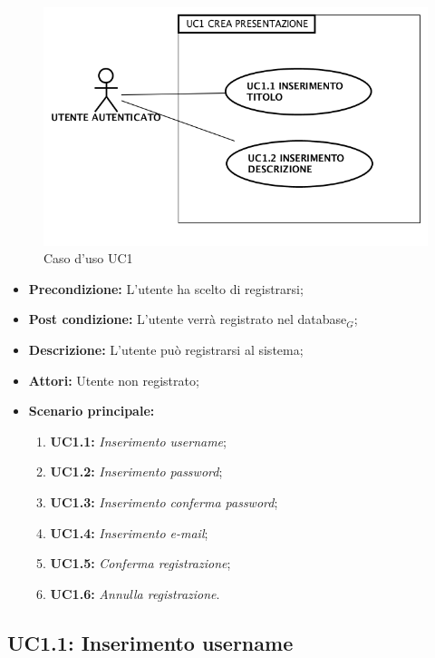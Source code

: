 \begin{figure}[h]
	\begin{center}
	\includegraphics[scale=0.4]{diagram/UC1.png}
	\caption{Caso d'uso UC1}
	\end{center}
\end{figure}
\begin{itemize}
	\item \textbf{Precondizione:} L'utente ha scelto di registrarsi;
	\item \textbf{Post condizione:} L'utente verrà registrato nel database$_G$;
	\item \textbf{Descrizione:} L'utente può registrarsi al sistema;
	\item \textbf{Attori:} Utente non registrato;
	\item \textbf{Scenario principale:}
	\begin{enumerate}
		\item \textbf{ UC1.1:} \textit{ Inserimento username};
		\item \textbf{ UC1.2:} \textit{ Inserimento password};
		\item \textbf{ UC1.3:} \textit{ Inserimento conferma password};
		\item \textbf{ UC1.4:} \textit{ Inserimento e-mail};
		\item \textbf{ UC1.5:} \textit{ Conferma registrazione};
		\item \textbf{ UC1.6:} \textit{ Annulla registrazione}.
	\end{enumerate}
\end{itemize}
\subsection{ UC1.1: Inserimento username}

